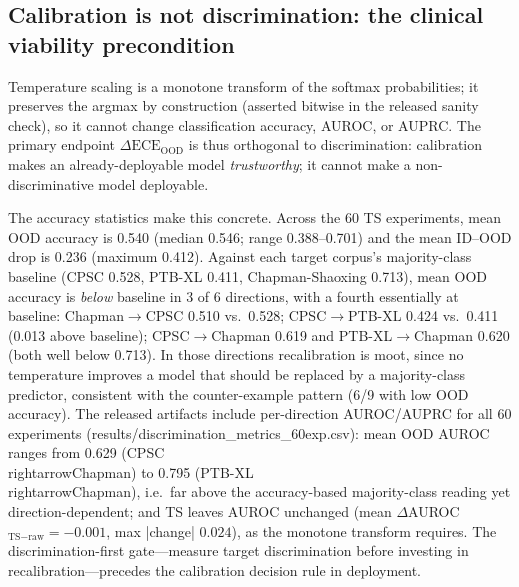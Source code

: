 \documentclass[review,12pt,nonatbib]{elsarticle}
\begin{document}
\subsection{Calibration is not discrimination: the clinical viability precondition}
Temperature scaling is a monotone transform of the softmax
probabilities; it preserves the argmax by construction (asserted
bitwise in the released sanity check), so it cannot change
classification accuracy, AUROC, or AUPRC. The primary endpoint
$\Delta\text{ECE}_{\text{OOD}}$ is thus orthogonal to discrimination:
calibration makes an already-deployable model \emph{trustworthy}; it
cannot make a non-discriminative model deployable.

The accuracy statistics make this concrete. Across the 60 TS
experiments, mean OOD accuracy is 0.540 (median 0.546; range
0.388--0.701) and the mean ID--OOD drop is 0.236 (maximum 0.412).
Against each target corpus's majority-class baseline (CPSC 0.528,
PTB-XL 0.411, Chapman-Shaoxing 0.713), mean OOD accuracy is
\emph{below} baseline in 3 of 6 directions, with a fourth essentially
at baseline: Chapman$\rightarrow$CPSC
0.510 vs.\ 0.528; CPSC$\rightarrow$PTB-XL 0.424 vs.\ 0.411 (0.013
above baseline); CPSC$\rightarrow$Chapman 0.619 and
PTB-XL$\rightarrow$Chapman 0.620 (both well below 0.713). In those
directions recalibration is moot, since no temperature improves a model that
should be replaced by a majority-class predictor, consistent with
the counter-example pattern (6/9 with low OOD accuracy).
The released artifacts include per-direction AUROC/AUPRC for all 60
experiments (results/discrimination\_metrics\_60exp.csv): mean OOD
AUROC ranges from 0.629 (CPSC\\rightarrowChapman) to 0.795
(PTB-XL\\rightarrowChapman), i.e.\ far above the accuracy-based
majority-class reading yet direction-dependent; and TS leaves AUROC
unchanged (mean $\Delta$AUROC$_{\text{TS}-\text{raw}}=-0.001$, max
|change| $0.024$), as the monotone transform requires. The discrimination-first
gate---measure target discrimination before investing in
recalibration---precedes the calibration decision rule in
deployment.
\end{document}

